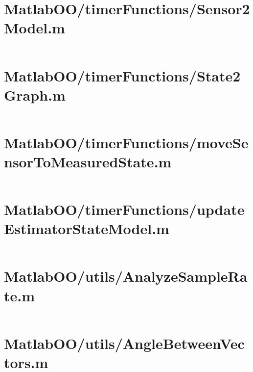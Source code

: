 \pagebreak
\section*{MatlabOO/timerFunctions/Sensor2Model.m}\label{code:MatlabOO/timerFunctions/Sensor2Model.m}
\inputminted[linenos,fontsize=\scriptsize]{matlab}{/home/dcouture/git/mathyourlife/TSatPy/beta_versions/matlab_object_oriented/timerFunctions/Sensor2Model.m}

\pagebreak
\section*{MatlabOO/timerFunctions/State2Graph.m}\label{code:MatlabOO/timerFunctions/State2Graph.m}
\inputminted[linenos,fontsize=\scriptsize]{matlab}{/home/dcouture/git/mathyourlife/TSatPy/beta_versions/matlab_object_oriented/timerFunctions/State2Graph.m}

\pagebreak
\section*{MatlabOO/timerFunctions/moveSensorToMeasuredState.m}\label{code:MatlabOO/timerFunctions/moveSensorToMeasuredState.m}
\inputminted[linenos,fontsize=\scriptsize]{matlab}{/home/dcouture/git/mathyourlife/TSatPy/beta_versions/matlab_object_oriented/timerFunctions/moveSensorToMeasuredState.m}

\pagebreak
\section*{MatlabOO/timerFunctions/updateEstimatorStateModel.m}\label{code:MatlabOO/timerFunctions/updateEstimatorStateModel.m}
\inputminted[linenos,fontsize=\scriptsize]{matlab}{/home/dcouture/git/mathyourlife/TSatPy/beta_versions/matlab_object_oriented/timerFunctions/updateEstimatorStateModel.m}

\pagebreak
\section*{MatlabOO/utils/AnalyzeSampleRate.m}\label{code:MatlabOO/utils/AnalyzeSampleRate.m}
\inputminted[linenos,fontsize=\scriptsize]{matlab}{/home/dcouture/git/mathyourlife/TSatPy/beta_versions/matlab_object_oriented/utils/AnalyzeSampleRate.m}

\pagebreak
\section*{MatlabOO/utils/AngleBetweenVectors.m}\label{code:MatlabOO/utils/AngleBetweenVectors.m}
\inputminted[linenos,fontsize=\scriptsize]{matlab}{/home/dcouture/git/mathyourlife/TSatPy/beta_versions/matlab_object_oriented/utils/AngleBetweenVectors.m}

